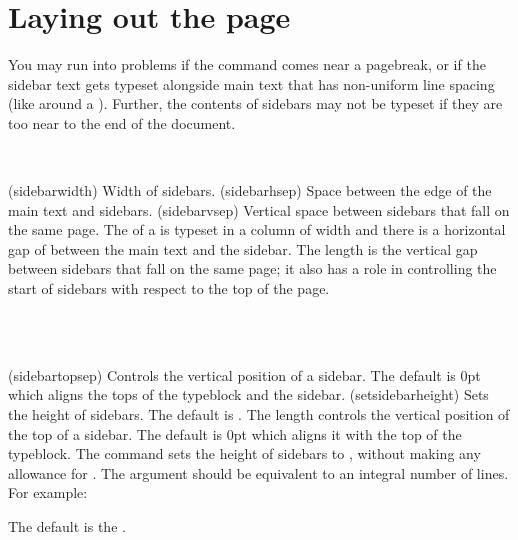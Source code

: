 \documentclass[10pt,a4paper,extrafontsizes]{memoir}
\begin{document}
\chapter{Laying out the page} \label{chap:layingpage}




    You may run into problems if the \cmd{\sidebar} command comes near 
a pagebreak, or if the sidebar text gets typeset alongside main text that
has non-uniform line spacing (like around a \cmd{\section}). Further,
the contents of sidebars may not be typeset if they are too near to the
end of the document.

\begin{syntax}
\lnc{\sidebarwidth} \lnc{\sidebarhsep} \lnc{\sidebarvsep} \\
\end{syntax}
\glossary(sidebarwidth)%
  {}%
  {Width of sidebars.}
\glossary(sidebarhsep)%
  {}%
  {Space between the edge of the main text and sidebars.}
\glossary(sidebarvsep)%
  {}%
  {Vertical space between sidebars that fall on the same page.}
The  of a \cmd{\sidebar} is typeset in a column of width 
\lnc{\sidebarwidth} and there is a horizontal gap of \lnc{\sidebarhsep}
between the main text and the sidebar. The length \lnc{\sidebarvsep}
is the vertical gap between sidebars that fall on the same page; it also
has a role in controlling the start of sidebars with respect to the
top of the page.

\begin{syntax}
\lnc{\sidebartopsep} \\
\cmd{\setsidebarheight} \\
\end{syntax}
\glossary(sidebartopsep)%
  {}%
  {Controls the vertical position of a sidebar. The default is 0pt which
   aligns the tops of the typeblock and the sidebar.}
\glossary(setsidebarheight)%
  {}%
  {Sets the height of sidebars. The default is .}
The length \lnc{\sidebartopsep} controls the vertical position of the top
of a sidebar. The default is 0pt which aligns it with the top of the
typeblock.
The command \cmd{\setsidebarheight} sets the height of sidebars to
, without making any allowance for \lnc{\sidebartopsep}.
The  argument should be equivalent to an integral number 
of lines. For example:
\begin{lcode}
\setsidebarheight{15\onelineskip}
\end{lcode}
The default is the \lnc{\textheight}.
\end{document}
